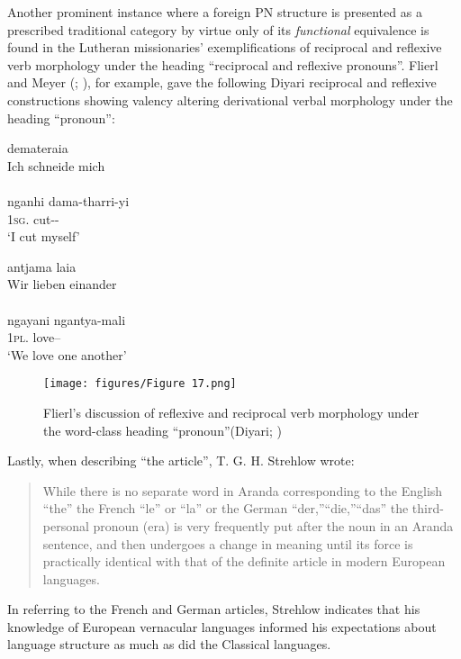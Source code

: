 Another prominent instance where a foreign PN structure is presented as a prescribed traditional category by virtue only of its \textit{functional} equivalence is found in the Lutheran missionaries' exemplifications of reciprocal and reflexive verb morphology under the heading “reciprocal and reflexive pronouns''. Flierl and Meyer (\citeyear[26]{flierl_christianieli_1880}; ), for example, gave the following Diyari reciprocal and reflexive constructions showing valency altering derivational verbal morphology under the heading “pronoun'':

\ea
{} {demateraia}\\
{Ich} {schneide mich} \\
\glt \citep[26]{flierl_dieri_1880} \\
\gll nganhi dama-tharri-yi\\
1\textsc{sg}.   cut--\\
\glt `I cut myself'
\z

\ea
{} {antjama laia}\\
{Wir} {lieben einander} \\ 
\glt \citep[26]{flierl_dieri_1880} \\
\gll ngayani ngantya-mali\\
1\textsc{pl}. love–\\
\glt `We love one another'
\z
    
\begin{figure}
\texttt{[image: figures/Figure 17.png]}
\caption{Flierl’s discussion of reflexive and reciprocal verb morphology under the word-class heading “pronoun”(Diyari; \citealt[26]{flierl_dieri_1880})}
\label{fig:2:17}
\end{figure}

Lastly, when describing “the article'', T. G. H. Strehlow wrote:
\begin{quote}
    While there is no separate word in Aranda corresponding to the English “the” the French “le” or “la” or the German “der,”“die,”“das” the third-personal pronoun (era) is very frequently put after the noun in an Aranda sentence, and then undergoes a change in meaning until its force is practically identical with that of the definite article in modern European languages. \citep[57]{strehlow_aranda_1944}
\end{quote}

In referring to the French and German articles, Strehlow indicates that his knowledge of European vernacular languages informed his expectations about language structure as much as did the Classical languages.

